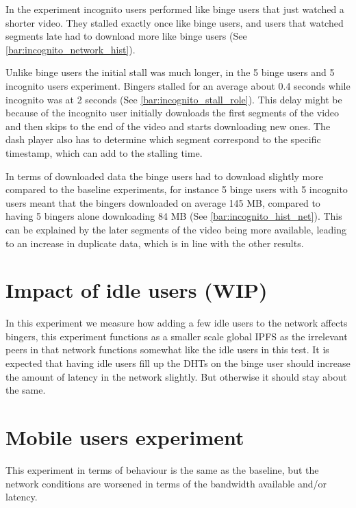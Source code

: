 In the experiment incognito users performed like binge users that just watched a shorter video. They stalled exactly once like binge users, and users that watched segments late had to download more like binge users (See \autoref{bar:incognito_network_hist}). 



Unlike binge users the initial stall was much longer, in the 5 binge users and 5 incognito users experiment. Bingers stalled for an average about 0.4 seconds while incognito was at 2 seconds (See \autoref{bar:incognito_stall_role}). This delay might be because of the incognito user initially downloads the first segments of the video and then skips to the end of the video and starts downloading new ones. The dash player also has to determine which segment correspond to the specific timestamp, which can add to the stalling time.



In terms of downloaded data the binge users had to download slightly more compared to the baseline experiments, for instance 5 binge users with 5 incognito users meant that the bingers downloaded on average 145 \ac{MB}, compared to having 5 bingers alone downloading 84 \ac{MB} (See \autoref{bar:incognito_hist_net}). This can be explained by the later segments of the video being more available, leading to an increase in duplicate data, which is in line with the other results.



\section{Impact of idle users (WIP)} %
In this experiment we measure how adding a few idle users to the network affects bingers, this experiment functions as a smaller scale global \ac{IPFS} as the irrelevant peers in that network functions somewhat like the idle users in this test. It is expected that having idle users fill up the \ac{DHT}s on the binge user should increase the amount of latency in the network slightly. But otherwise it should stay about the same.

\section{Mobile users experiment} %
This experiment in terms of behaviour is the same as the baseline, but the network conditions are worsened  in terms of the bandwidth available and/or latency. 

